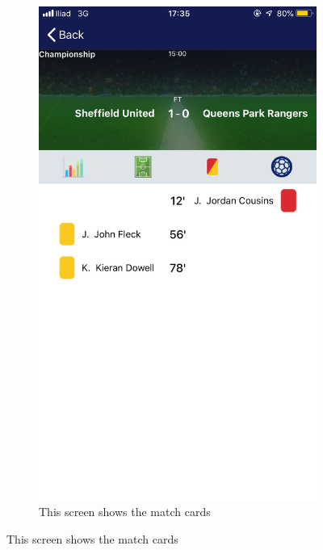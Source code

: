 \documentclass[numbers=noenddot, 12pt, a4paper, oneside]{scrbook}
\begin{document}
\begin{figure}[H]
\begin{subfigure}{.5\textwidth}
		\includegraphics[width=.8\linewidth]{images/Screen/Cards}
		\caption{This screen shows the match cards}
	\end{subfigure}
\end{figure}
\end{document}
